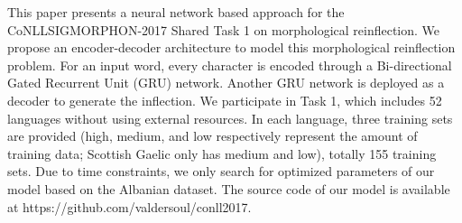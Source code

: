 This paper presents a neural network based approach for the CoNLLSIGMORPHON-2017 Shared Task 1 on morphological reinflection. We propose an encoder-decoder architecture to model this morphological reinflection problem. For an input word, every character is encoded through a Bi-directional Gated Recurrent Unit (GRU) network. Another GRU network is deployed as a decoder to generate the inflection. We participate in Task 1, which includes 52 languages without using external resources. In each language, three training sets are provided (high, medium, and low respectively represent the amount of training data; Scottish Gaelic only has medium and low), totally 155 training sets. Due to time constraints, we only search for optimized parameters of our model based on the Albanian dataset. The source code of our model is available at https://github.com/valdersoul/conll2017.
